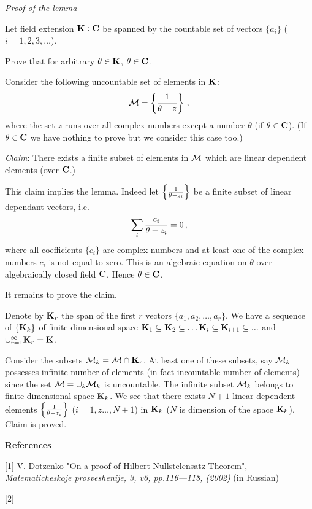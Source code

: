   \m

  {\it Proof of the lemma}

   Let field extension ${\bf K}:{\bf C}$ be spanned by the countable set of vectors $\{a_i\}$ ($i=1,2,3,\dots$).

   Prove that for arbitrary $\theta\in {\bf K}$,   $\theta\in {\bf C}$.

 Consider the following uncountable set of elements in ${\bf K}$:
                $$
             {\cal M}=\left\{{1\over \theta-z}\right\}\,,
                $$
      where the set $z$ runs over all complex numbers except a number $\theta$ (if $\theta\in {\bf C}$).
       (If $\theta\in {\bf C}$ we have nothing to prove but we consider this case too.)

\m

    {\it Claim}: There exists a finite subset of elements in ${\cal M}$
    which are linear dependent elements (over ${\bf C}$.)

\m

  This claim implies the lemma. Indeed let $\left\{{1\over \theta-z_i}\right\}$ be a  finite subset 
  of linear dependant vectors, i.e.
                       $$
           \sum_i {c_i\over \theta-z_i}=0\,,
                             $$
            where all coefficients $\{c_i\}$ are complex numbers 
            and at least one of the complex numbers $c_i$ is not equal to zero.
  This is an algebraic equation on $\theta$ over algebraically closed field ${\bf C}$.
 Hence $\theta\in {\bf C}$.

\smallskip

                It remains to prove the claim.

                \m

   Denote by ${\bf K}_r$ the span of the first $r$ vectors $\{a_1,a_2,\dots, a_r\}$.
   We have a sequence of $\{{\bf K}_k\}$ of finite-dimensional space ${\bf K}_1\subseteq {\bf K}_2\subseteq\dots {\bf K}_i\subseteq {\bf K}_{i+1}\subseteq ...$ and
$\cup_{r=1}^\infty {\bf K}_r={\bf K}$.

         Consider the subsets ${\cal M}_k={\cal M} \cap {\bf K}_r$.
        At least one of these subsets, say ${\cal M}_k$ possesses infinite number of elements 
        (in fact incountable number of elements)
        since the set ${\cal M}=\cup_k {\cal M}_k$ is uncountable. The infinite subset ${\cal M}_k$ belongs to 
        finite-dimensional space ${\bf K}_k$.
         We see that there exists
    $N+1$ linear dependent elements $\left\{{1\over \theta-z_i}\right\}$ ($i=1,z\dots,N+1$)
    in ${\bf K}_k$ ($N$ is dimension of the space ${\bf K}_k$). Claim is proved.





\centerline{\bf References}


[1] V. Dotzenko  "On a proof of Hilbert Nullstelensatz Theorem",
 {\it Matematicheskoje prosveshenije, 3, v6, pp.116---118, (2002)} (in Russian)

[2] 

\bye